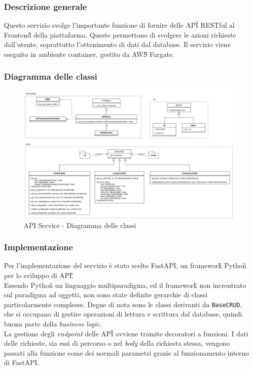 \subsubsection{Descrizione generale}
Questo servizio svolge l'importante funzione di fornire delle API\G{} RESTful al Frontend\G{} della piattaforma.
Queste permettono di svolgere le azioni richieste dall'utente, soprattutto l'ottenimento di dati dal database.
Il servizio viene eseguito in ambiente container, gestito da AWS\G{} Fargate.

\subsubsection{Diagramma delle classi}
\begin{figure}[H]
    \includegraphics[width=16cm]{sezioni/images/cd_api.png}
    \centering
    \caption{API Service - Diagramma delle classi}
\end{figure}

\subsubsection{Implementazione}
Per l'implementazione del servizio è stato scelto FastAPI, un framework\G{} Python\G{} per lo sviluppo di API\G.\\
Essendo Python\G{} un linguaggio multiparadigma, ed il framework\G{} non increntrato sul paradigma ad oggetti, non sono state definite gerarchie di classi particolarmente complesse.
Degne di nota sono le classi derivanti da \verb|BaseCRUD|, che si occupano di gestire operazioni
di lettura e scrittura dal database, quindi buona parte della \textit{business logic}.\\
La gestione degli \textit{endpoint} delle API\G{} avviene tramite decoratori a funzioni.
I dati delle richieste, sia essi di percorso o nel \textit{body} della richiesta stessa, vengono passati alla funzione come dei normali parametri grazie al funzionamento interno di FastAPI.

